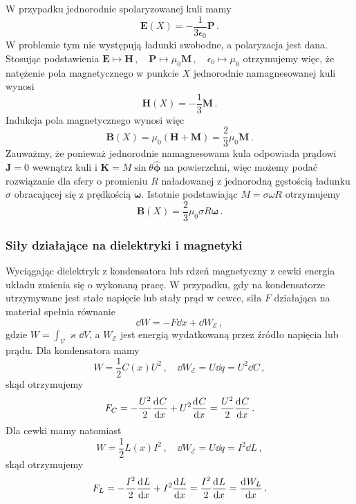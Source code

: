 \documentclass[../main.tex]{subfiles}
\begin{document}
\begin{enumerate}
    W przypadku jednorodnie spolaryzowanej kuli mamy
    \begin{equation*}
        \mathbf{E}(X)=-\frac{1}{3\epsilon_0}\mathbf{P}\,.
    \end{equation*}
    W problemie tym nie występują ładunki swobodne, a polaryzacja jest dana. Stosując podstawienia
    \(\mathbf{E}\mapsto\mathbf{H}\,,\quad
    \mathbf{P}\mapsto\mu_0\mathbf{M}\,,\quad\epsilon_0\mapsto\mu_0\) otrzymujemy więc, że natężenie
    pola magnetycznego w punkcie \(X\) jednorodnie namagnesowanej kuli wynosi
    \begin{equation*}
        \mathbf{H}(X)=-\frac{1}{3}\mathbf{M}\,.
    \end{equation*}
    Indukcja pola magnetycznego wynosi więc
    \begin{equation*}
        \mathbf{B}(X)=\mu_0(\mathbf{H}+\mathbf{M})=\frac{2}{3}\mu_0\mathbf{M}\,.
    \end{equation*}
    Zauważmy, że ponieważ jednorodnie namagnesowana kula odpowiada prądowi \(\mathbf{J}=0\) wewnątrz
    kuli i \(\mathbf{K}=M\sin\theta\boldsymbol{\hat{\phi}}\) na powierzchni, więc możemy podać
    rozwiązanie dla sfery o promieniu \(R\) naładowanej z jednorodną gęstością ładunku \(\sigma\)
    obracającej się z prędkością \(\boldsymbol{\omega}\). Istotnie podstawiając \(M=\sigma\omega R\)
    otrzymujemy
    \begin{equation*}
        \mathbf{B}(X)=\frac{2}{3}\mu_0\sigma R\boldsymbol{\omega}\,.
    \end{equation*}
\end{enumerate}
\subsubsection{Siły działające na dielektryki i magnetyki}
Wyciągając dielektryk z kondensatora lub rdzeń magnetyczny z cewki energia układu zmienia się o
wykonaną pracę. W przypadku, gdy na kondensatorze utrzymywane jest stałe napięcie lub stały prąd w
cewce, siła \(F\) działająca na materiał spełnia równanie
\begin{equation*}
    \dd{W}=-F\dd{x}+\dd{W}_\mathcal{E}\,,
\end{equation*}
gdzie \(W=\int_\mathcal{V}\varkappa\dd{V}\), a \(W_\mathcal{E}\) jest energią wydatkowaną przez
źródło napięcia lub prądu. Dla kondensatora mamy
\begin{equation*}
    W=\frac{1}{2}C(x)U^2\,,\quad \dd{W}_\mathcal{E}=U\dd{q}=U^2\dd{C}\,,
\end{equation*}
skąd otrzymujemy
\begin{equation*}
    F_C=-\frac{U^2}{2}\dv[]{C}{x}+U^2\dv[]{C}{x}=\frac{U^2}{2}\dv[]{C}{x}\,.
\end{equation*}
Dla cewki mamy natomiast
\begin{equation*}
     W=\frac{1}{2}L(x)I^2\,,\quad \dd{W}_\mathcal{E}=U\dd{q}=I^2\dd{L}\,,
\end{equation*}
skąd otrzymujemy
\begin{equation*}
    F_L=-\frac{I^2}{2}\dv[]{L}{x}+I^2\dv[]{L}{x}=\frac{I^2}{2}\dv[]{L}{x}=\dv[]{W_L}{x}\,.
\end{equation*}
\end{document}
